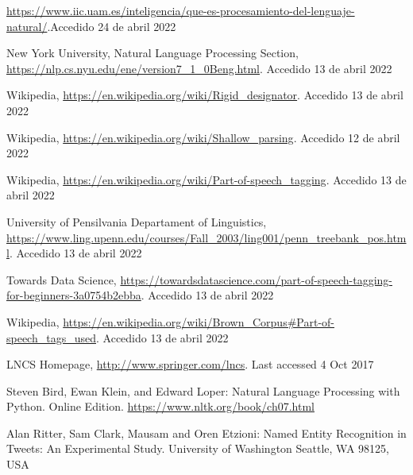 \documentclass[runningheads]{llncs}
\begin{document}
\begin{thebibliography}{8}
%
%
%

\url{https://www.iic.uam.es/inteligencia/que-es-procesamiento-del-lenguaje-natural/}.Accedido 24 de abril 2022

New York University, Natural Language Processing Section, \url{https://nlp.cs.nyu.edu/ene/version7\_1\_0Beng.html}. Accedido 13 de abril 2022

Wikipedia, \url{https://en.wikipedia.org/wiki/Rigid\_designator}. Accedido 13 de abril 2022

Wikipedia, \url{https://en.wikipedia.org/wiki/Shallow\_parsing}. Accedido 12 de abril 2022

Wikipedia, \url{https://en.wikipedia.org/wiki/Part-of-speech\_tagging}. Accedido 13 de abril 2022

University of Pensilvania Departament of Linguistics, \url{https://www.ling.upenn.edu/courses/Fall\_2003/ling001/penn\_treebank\_pos.html}. Accedido 13 de abril 2022

Towards Data Science, \url{https://towardsdatascience.com/part-of-speech-tagging-for-beginners-3a0754b2ebba}. Accedido 13 de abril 2022

Wikipedia, \url{https://en.wikipedia.org/wiki/Brown\_Corpus\#Part-of-speech\_tags\_used}. Accedido 13 de abril 2022

LNCS Homepage, \url{http://www.springer.com/lncs}. Last accessed 4 Oct 2017

Steven Bird, Ewan Klein, and Edward Loper: Natural Language Processing with Python. Online Edition. \url{https://www.nltk.org/book/ch07.html}

Alan Ritter, Sam Clark, Mausam and Oren Etzioni: Named Entity Recognition in Tweets:
An Experimental Study. University of Washington Seattle, WA 98125, USA


\end{thebibliography}
\end{document}
